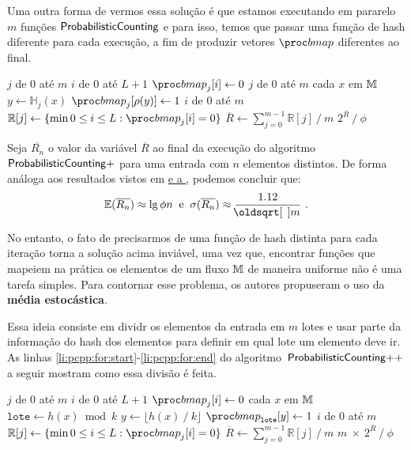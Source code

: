 Uma outra forma de vermos essa solução é que estamos executando em pararelo $m$ funções $\textsf{ProbabilisticCounting}$ e para isso, temos que 
passar uma função de hash diferente para cada execução, a fim de produzir vetores $\bitmap$ diferentes ao final.

\begin{codebox}
  \li \For $j$ de $0$ até $m$
      \Do
  \li    \For $i$ de $0$ até $L + 1$
          \Do
  \li       $\bitmap_{j}[i] \gets 0$
          \End
      \End
  \li \For $j$ de $0$ até $m$
      \Do
  \li    \For cada $x$ em $\mathbb{M}$
          \Do
  \li       $y \gets \mathbb{H}_{j}(x)$
  \li       $\bitmap_j[\rho(y)] \gets 1$
          \End
      \End
  \li \For $i$ de $0$ até $m$
      \Do
  \li    $\mathbb{R}[j] \gets \{ \min 0 \leq i \leq L: \bitmap_{j}[i] = 0 \}$
      \End
  \li $\overline{R} \gets \sum_{j=0}^{m-1} \mathbb{R}[j] \mathbin{/} m$
  \li \Return $2^{\overline{R}} \mathbin{/} \phi$
  \End
\end{codebox}

Seja $\overline{R_n}$ o valor da variável $\overline{R}$ ao final da execução do algoritmo~$\textsf{ProbabilisticCounting}{+}$ para uma
entrada com $n$ elementos distintos. De forma análoga aos resultados vistos em \hyperref[sec:morris:plus]{ 
e a }, podemos concluir que:
\[ \Ebb(\overline{R_n}) \approx \lg \phi n   \; \; \text{e}  \; \; \sigma(\overline{R_n}) \approx \frac{1.12}{\sqrt{m}} \ . \]

No entanto, o fato de precisarmos de uma função de hash distinta para cada iteração torna a solução acima inviável, uma 
vez que, encontrar funções que mapeiem na prática os elementos de um fluxo $\mathbb{M}$ de maneira uniforme não é uma 
tarefa simples. Para contornar esse problema, os autores propuseram o uso da \textbf{média estocástica}.

Essa ideia consiste em dividr os elementos da entrada em $m$ lotes e usar parte da informação do hash dos elementos para 
definir em qual lote um elemento deve ir. As linhas \ref{li:pcpp:for:start}-\ref{li:pcpp:for:end} do algoritmo~$\textsf{ProbabilisticCounting{++}}$ 
a seguir mostram como essa divisão é feita.

\begin{codebox}
  \li \For $j$ de $0$ até $m$
      \Do
  \li    \For $i$ de $0$ até $L + 1$
          \Do
  \li       $\bitmap_{j}[i] \gets 0$
          \End
      \End
  \li \For cada $x$ em $\mathbb{M}$                                                         \label{li:pcpp:for:start}
      \Do
  \li   $\texttt{lote} \gets h(x) \bmod k$
  \li   $y \gets \lfloor h(x) \mathbin{/} k \rfloor$
  \li   $\bitmap_{\texttt{lote}}[y] \gets 1$                                              \label{li:pcpp:for:end}
      \End
  \li \For $i$ de $0$ até $m$
      \Do
  \li    $\mathbb{R}[j] \gets \{ \min 0 \leq i \leq L: \bitmap_{j}[i] = 0 \}$             \label{li:pcpp:rmin}
      \End
  \li $\overline{R} \gets \sum_{j=0}^{m-1} \mathbb{R}[j] \mathbin{/} m$
  \li \Return $m \ \times \ 2^{\overline{R}} \mathbin{/} \phi$
  \End
\end{codebox}

